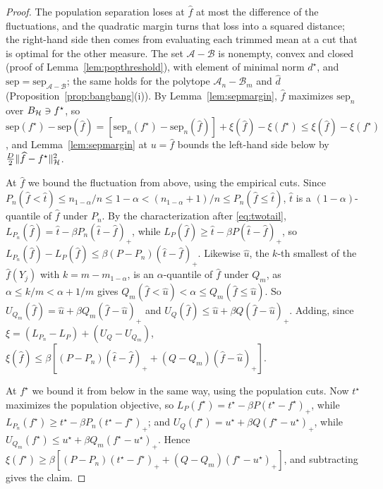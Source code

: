 \begin{proof}
The population separation loses at $\widehat f$ at most the difference of the fluctuations, and the
quadratic margin turns that loss into a squared distance; the right-hand side then comes from evaluating each trimmed
mean at a cut that is optimal for the other measure. The set $\mathcal A-\mathcal B$ is nonempty, convex and closed (proof of
Lemma~\ref{lem:popthreshold}), with element of minimal norm $d^\star$, and $\mathrm{sep}=\mathrm{sep}_{\mathcal
A-\mathcal B}$; the same holds for the polytope $\mathcal A_n-\mathcal B_m$ and $\widehat d$
(Proposition~\ref{prop:bangbang}(i)). By Lemma~\ref{lem:sepmargin}, $\widehat f$ maximizes $\mathrm{sep}_n$ over
$B_{\mathcal{H}}\ni f^\star$, so $\mathrm{sep}(f^\star)-\mathrm{sep}(\widehat f)=[\mathrm{sep}_n(f^\star)-\mathrm{sep}_n(\widehat
f)]+\xi(\widehat f)-\xi(f^\star)\le\xi(\widehat f)-\xi(f^\star)$, and Lemma~\ref{lem:sepmargin} at $u=\widehat f$ bounds
the left-hand side below by $\tfrac D2\|\widehat f-f^\star\|^2_{\mathcal{H}}$.

At $\widehat f$ we bound the fluctuation from above, using the empirical cuts. Since $P_n(\widehat f<\widehat t)\le n_{1-\alpha}/n\le1-\alpha<(n_{1-\alpha}+1)/n\le
P_n(\widehat f\le\widehat t)$, $\widehat t$ is a $(1-\alpha)$-quantile of $\widehat f$ under $P_n$. By the
characterization after \eqref{eq:twotail}, $L_{P_n}(\widehat f)=\widehat t-\beta P_n(\widehat t-\widehat f)_+$, while
$L_P(\widehat f)\ge\widehat t-\beta P(\widehat t-\widehat f)_+$, so $L_{P_n}(\widehat f)-L_P(\widehat f)\le\beta(P-P_n)
(\widehat t-\widehat f)_+$. Likewise $\widehat u$, the $k$-th smallest of the $\widehat f(Y_j)$ with $k=m-m_{1-\alpha}$, is an $\alpha$-quantile of
$\widehat f$ under $Q_m$, as $\alpha\le k/m<\alpha+1/m$ gives $Q_m(\widehat f<\widehat u)<\alpha\le Q_m(\widehat f\le\widehat u)$. So
$U_{Q_m}(\widehat f)=\widehat u+\beta Q_m(\widehat f-\widehat u)_+$ and $U_Q(\widehat f)\le\widehat u+\beta Q(\widehat
f-\widehat u)_+$. Adding, since $\xi=(L_{P_n}-L_P)+(U_Q-U_{Q_m})$,
$\xi(\widehat f)\le\beta[(P-P_n)(\widehat t-\widehat f)_++(Q-Q_m)(\widehat f-\widehat u)_+]$.

At $f^\star$ we bound it from below in the same way, using the population cuts. Now $t^\star$ maximizes the population objective, so $L_P(f^\star)=t^\star-\beta
P(t^\star-f^\star)_+$, while $L_{P_n}(f^\star)\ge t^\star-\beta P_n(t^\star-f^\star)_+$; and $U_Q(f^\star)=u^\star+\beta
Q(f^\star-u^\star)_+$, while $U_{Q_m}(f^\star)\le u^\star+\beta Q_m(f^\star-u^\star)_+$. Hence
$\xi(f^\star)\ge\beta[(P-P_n)(t^\star-f^\star)_++(Q-Q_m)(f^\star-u^\star)_+]$, and subtracting gives the claim.
\end{proof}

